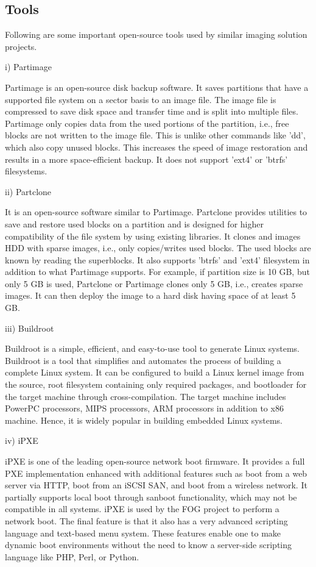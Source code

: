 \documentclass[a4paper,12pt]{article}
\begin{document}
\subsection{Tools}
Following are some important open-source tools used by similar imaging solution projects. 

i) Partimage

Partimage is an open-source disk backup software. It saves partitions that have a supported file system on a sector basis to an image file. The image file is compressed to save disk space and transfer time and is split into multiple files. Partimage only copies data from the used portions of the partition, i.e., free blocks are not written to the image file. This is unlike other commands like 'dd', which also copy unused blocks. This increases the speed of image restoration and results in a more space-efficient backup. It does not support 'ext4' or 'btrfs' filesystems.

ii) Partclone

It is an open-source software similar to Partimage. Partclone provides utilities to save and restore used blocks on a partition and is designed for higher compatibility of the file system by using existing libraries. It clones and images HDD with sparse images, i.e., only copies/writes used blocks. The used blocks are known by reading the superblocks. It also supports 'btrfs' and 'ext4' filesystem in addition to what Partimage supports. 
For example, if partition size is 10 GB, but only 5 GB is used, Partclone or Partimage clones only 5 GB, i.e., creates sparse images. It can then deploy the image to a hard disk having space of at least 5 GB.

iii) Buildroot 

Buildroot is a simple, efficient, and easy-to-use tool to generate Linux systems. Buildroot is a tool that simplifies and automates the process of building a complete Linux system. It can be configured to build a Linux kernel image from the source, root filesystem containing only required packages, and bootloader for the target machine through cross-compilation. The target machine includes PowerPC processors, MIPS processors, ARM processors in addition to x86 machine. Hence, it is widely popular in building embedded Linux systems. 

iv) iPXE

iPXE is one of the leading open-source network boot firmware. It provides a full PXE implementation enhanced with additional features such as boot from a web server via HTTP, boot from an iSCSI SAN, and boot from a wireless network. It partially supports local boot through sanboot functionality, which may not be compatible in all systems. iPXE is used by the FOG project to perform a network boot. The final feature is that it also has a very advanced scripting language and text-based menu system. These features enable one to make dynamic boot environments without the need to know a server-side scripting language like PHP, Perl, or Python.
\end{document}
